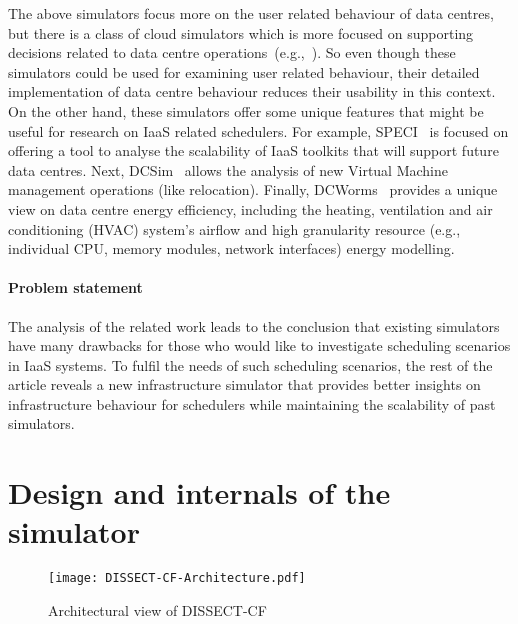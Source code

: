 \documentclass[sort, compress, 5p]{elsarticle}
\begin{document}
The above simulators focus more on the user related behaviour of data centres, but there is a class of cloud simulators which is more focused on supporting decisions related to data centre operations~(e.g.,~\cite{SPECI-sriram2009speci, DCSim-tighe2012dcsim, DCWorms-piatek2013dcworms}). So even though these simulators could be used for examining user related behaviour, their detailed implementation of data centre behaviour reduces their usability in this context. On the other hand, these simulators offer some unique features that might be useful for research on IaaS related schedulers. For example, SPECI~\cite{SPECI-sriram2009speci} is focused on offering a tool to analyse the scalability of IaaS toolkits that will support future data centres. Next, DCSim~\cite{DCSim-tighe2013towards} allows the analysis of new Virtual Machine management operations (like relocation). Finally, DCWorms~\cite{DCWorms-kurowski2013dcworms} provides a unique view on data centre energy efficiency, including the heating, ventilation and air conditioning (HVAC) system's airflow and high granularity resource (e.g., individual CPU, memory modules, network interfaces) energy modelling.

\paragraph{Problem statement} The analysis of the related work leads to the conclusion that existing simulators have many drawbacks for those who would like to investigate scheduling scenarios in IaaS systems. To fulfil the needs of such scheduling scenarios, the rest of the article reveals a new infrastructure simulator that provides better insights on infrastructure behaviour for schedulers while maintaining the scalability of past simulators.

\section{Design and internals of the simulator} \label{sec-design}

\begin{figure}[tb]
\centering
\texttt{[image: DISSECT-CF-Architecture.pdf]}
\caption{Architectural view of DISSECT-CF \label{FIG-ARCH}}
\end{figure}
\end{document}
